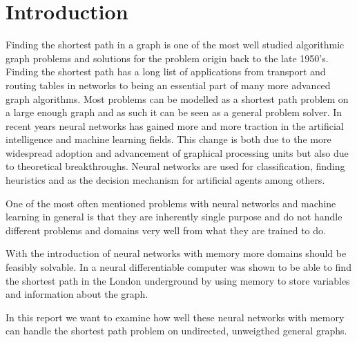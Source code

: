 
\section{Introduction}
Finding the shortest path in a graph is one of the most well studied algorithmic graph problems and solutions for the problem origin back to the late 1950's. Finding the shortest path has a long list of applications from transport and routing tables in networks to being an essential part of many more advanced graph algorithms. Most problems can be modelled as a shortest path problem on a large enough graph and as such it can be seen as a general problem solver. In recent years neural networks has gained more and more traction in the artificial intelligence and machine learning fields. This change is both due to the more widespread adoption and advancement of graphical processing units but also due to theoretical breakthroughs. Neural networks are used for classification, finding heuristics and as the decision mechanism for artificial agents among others.

\newpar One of the most often mentioned problems with neural networks and machine learning in general is that they are inherently single purpose and do not handle different problems and domains very well from what they are trained to do.

\newpar With the introduction of neural networks with memory more domains should be feasibly solvable. In  a neural differentiable computer was shown to be able to find the shortest path in the London underground by using memory to store variables and information about the graph.

\newpar In this report we want to examine how well these neural networks with memory can handle the shortest path problem on undirected, unweigthed general graphs.